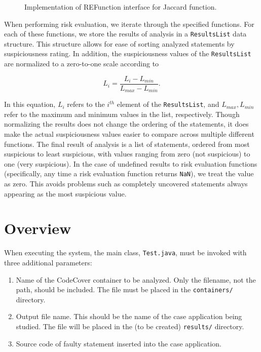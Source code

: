 \begin{figure}[tb]
\centering

\caption{Implementation of REFunction interface for Jaccard function.}
\label{fig:re}
\end{figure}

When performing risk evaluation, we iterate through the specified functions.  For each of these
functions, we store the results of analysis in a \texttt{ResultsList} data structure.  This
structure allows for ease of sorting analyzed statements by suspiciousness rating.  In addition, the
suspiciousness values of the \texttt{ResultsList} are normalized to a zero-to-one scale according to

\[ L_i = \frac{ L_i - L_{min} }{ L_{max} - L_{min} }. \]

In this equation, $L_i$ refers to the $i^{th}$ element of the \texttt{ResultsList}, and $L_{max}, L_{min}$
refer to the maximum and minimum values in the list, respectively.  Though normalizing the results does
not change the ordering of the statements, it does make the actual suspiciousness values easier to compare
across multiple different functions.  The final result of analysis is a list of statements, ordered from
most suspicious to least suspicious, with values ranging from zero (not suspicious) to one (very 
suspicious).  In the case of undefined results to risk evaluation functions (specifically, any time a
risk evaluation function returns \texttt{NaN}), we treat the value as zero.  This avoids problems such as
completely uncovered statements always appearing as the most suspicious value.

\section{Overview} \label{sec:over}

When executing the system, the main class, \texttt{Test.java}, must be invoked with three additional
parameters:

\begin{enumerate}
\item Name of the CodeCover container to be analyzed.  Only the filename, not the path, should be included.  The file must be placed in the \texttt{containers/} directory.
\item Output file name.  This should be the name of the case application being studied.  The file will be placed in the (to be created) \texttt{results/} directory.
\item Source code of faulty statement inserted into the case application.
\end{enumerate}

